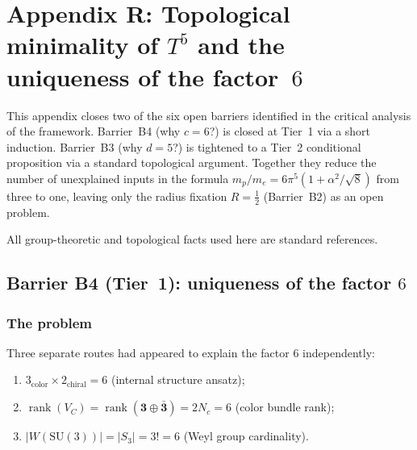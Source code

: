 
\section{Appendix R: Topological minimality of $T^5$ and the
  uniqueness of the factor~$6$}
\label{app:topological}

This appendix closes two of the six open barriers identified in the
critical analysis of the framework.  Barrier~B4 (why $c=6$?) is closed
at Tier~1 via a short induction.  Barrier~B3 (why $d=5$?) is tightened
to a Tier~2 conditional proposition via a standard topological argument.
Together they reduce the number of unexplained inputs in the formula
$m_p/m_e = 6\pi^5(1+\alpha^2/\sqrt{8})$ from three to one,
leaving only the radius fixation $R=\tfrac{1}{2}$ (Barrier~B2) as an
open problem.

All group-theoretic and topological facts used here are standard
references.

\subsection{Barrier B4 (Tier~1): uniqueness of the factor $6$}
\label{ssec:B4}

\subsubsection{The problem}

Three separate routes had appeared to explain the factor $6$
independently:

\begin{enumerate}[label=(\alph*)]
  \item $3_{\mathrm{color}}\times 2_{\mathrm{chiral}}=6$
        (internal structure ansatz);
  \item $\operatorname{rank}(V_C)
        = \operatorname{rank}(\mathbf{3}\oplus\bar{\mathbf{3}}) = 2N_c = 6$
        (color bundle rank);
  \item $|W(\mathrm{SU}(3))| = |S_3| = 3! = 6$
        (Weyl group cardinality).
\end{enumerate}

